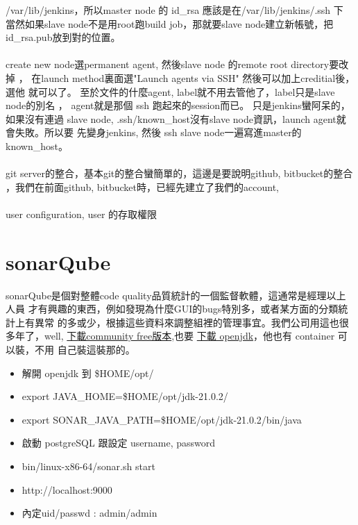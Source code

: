   /var/lib/jenkins，所以master node 的 id\_rsa 應該是在/var/lib/jenkins/.ssh 下
  當然如果slave node不是用root跑build job，那就要slave node建立新帳號，把
  id\_rsa.pub放到對的位置。
  \\\\
  create new node選permanent agent, 然後slave node 的remote root directory要改掉
  ， 在launch method裏面選"Launch agents via SSH" 然後可以加上creditial後，選他
  就可以了。 至於文件的什麼agent, label就不用去管他了，label只是slave node的別名
  ， agent就是那個 ssh 跑起來的session而已。 只是jenkins蠻阿呆的，如果沒有連過
  slave node, .ssh/known\_host沒有slave node資訊，launch agent就會失敗。所以要
  先變身jenkins, 然後 ssh slave node一遍寫進master的known\_host。
  \\\\
  git server的整合，基本git的整合蠻簡單的，這邊是要說明github, bitbucket的整合
  ，我們在前面github, bitbucket時，已經先建立了我們的account,
  \\\\
  user configuration, user 的存取權限

\section{sonarQube}
  sonarQube是個對整體code quality品質統計的一個監督軟體，這通常是經理以上人員
  才有興趣的東西，例如發現為什麼GUI的bugs特別多，或者某方面的分類統計上有異常
  的多或少，根據這些資料來調整組裡的管理事宜。我們公司用這也很多年了，well,
  \href{https://www.sonarqube.org/downloads/}{下載community free版本},也要
  \href{https://openjdk.org/}{下載 openjdk}，他也有 container 可以裝，不用
  自己裝這裝那的。
  \begin{itemize}
    \item 解開 openjdk 到 \$HOME/opt/
    \item export JAVA\_HOME=\$HOME/opt/jdk-21.0.2/
    \item export SONAR\_JAVA\_PATH=\$HOME/opt/jdk-21.0.2/bin/java
    \item 啟動 postgreSQL 跟設定 username, password
    \item bin/linux-x86-64/sonar.sh start
    \item http://localhost:9000
    \item 內定uid/passwd : admin/admin
  \end{itemize}
